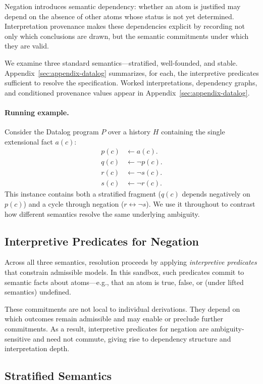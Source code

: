 \documentclass[acmsmall,nonacm]{acmart}
\theoremstyle{remark}
\numberwithin{definition}{section}
\numberwithin{theorem}{section}
\numberwithin{lemma}{section}
\numberwithin{corollary}{section}
\numberwithin{remark}{section}
\numberwithin{example}{section}
\numberwithin{observation}{section}
\numberwithin{assumption}{section}
\begin{document}
Negation introduces semantic dependency: whether an atom is justified may depend
on the absence of other atoms whose status is not yet determined.
Interpretation provenance makes these dependencies explicit by recording not only
which conclusions are drawn, but the semantic commitments under which they are
valid.

We examine three standard semantics—stratified, well-founded, and stable.
Appendix~\ref{sec:appendix-datalog} summarizes, for each, the interpretive predicates
sufficient to resolve the specification.
Worked interpretations, dependency graphs, and conditioned provenance values
appear in Appendix~\ref{sec:appendix-datalog}.

\paragraph{Running example.}
Consider the Datalog program $P$ over a history $H$ containing the single
extensional fact $a(c)$:
\begin{align*}
  p(c) &\leftarrow a(c).\\
  q(c) &\leftarrow \neg p(c).\\[1mm]
  r(c) &\leftarrow \neg s(c).\\
  s(c) &\leftarrow \neg r(c).
\end{align*}
This instance contains both a stratified fragment
($q(c)$ depends negatively on $p(c)$) and a cycle through negation
($r \leftrightarrow \neg s$).
We use it throughout to contrast how different semantics resolve the same
underlying ambiguity.

\subsection{Interpretive Predicates for Negation}

Across all three semantics, resolution proceeds by applying \emph{interpretive
predicates} that constrain admissible models.
In this sandbox, such predicates commit to semantic facts about atoms—e.g.,
that an atom is true, false, or (under lifted semantics) undefined.

These commitments are not local to individual derivations.
They depend on which outcomes remain admissible and may enable or preclude further
commitments.
As a result, interpretive predicates for negation are ambiguity-sensitive and need
not commute, giving rise to dependency structure and interpretation depth.

\subsection{Stratified Semantics}
\end{document}
